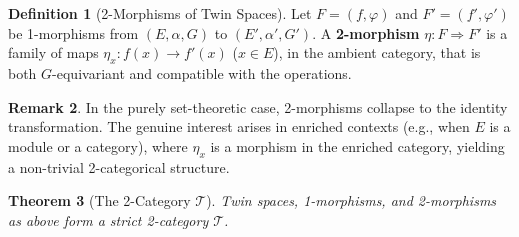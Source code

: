 \documentclass[11pt,a4paper,openany]{book}
\theoremstyle{plain}
\newtheorem{theorem}{Theorem}[chapter]
\theoremstyle{definition}
\newtheorem{definition}[theorem]{Definition}
\newtheorem{remark}[theorem]{Remark}
\newcommand{\actspace}{E}
\newcommand{\groupG}{G}
\begin{document}
\begin{definition}[2-Morphisms of Twin Spaces]\label{def:twin-2-morph}
Let $F = (f, \varphi)$ and $F' = (f', \varphi')$ be 1-morphisms from $(\actspace, \alpha, \groupG)$ to $(\actspace', \alpha', \groupG')$. A \textbf{2-morphism} $\eta : F \Rightarrow F'$ is a family of maps $\eta_x : f(x) \to f'(x)$ ($x \in \actspace$), in the ambient category, that is both $\groupG$-equivariant and compatible with the operations.
\end{definition}

\begin{remark}
In the purely set-theoretic case, 2-morphisms collapse to the identity transformation. The genuine interest arises in enriched contexts (e.g., when $\actspace$ is a module or a category), where $\eta_x$ is a morphism in the enriched category, yielding a non-trivial 2-categorical structure.
\end{remark}

\begin{theorem}[The 2-Category $\mathcal{T}$]\label{thm:2-cat}
Twin spaces, 1-morphisms, and 2-morphisms as above form a strict 2-category $\mathcal{T}$.
\end{theorem}
\end{document}
